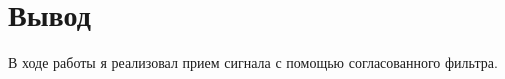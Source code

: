 \chapter{Вывод}
\label{ch:сhap5}

В ходе работы я реализовал прием сигнала с помощью согласованного фильтра.